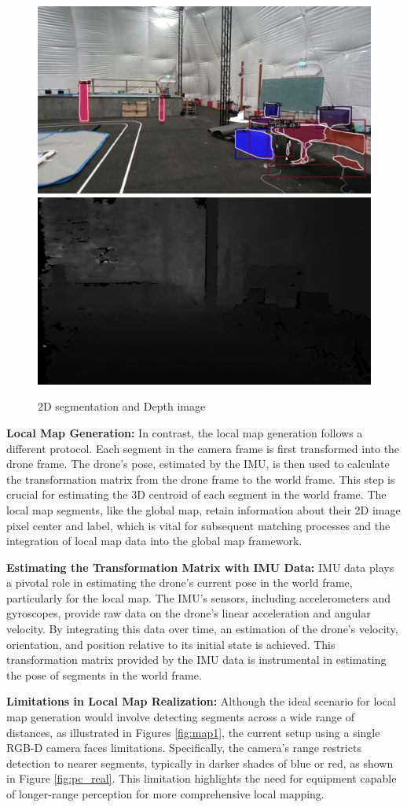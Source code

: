 \begin{figure}[H]
    \centering
    \includegraphics[width=.5\linewidth]{Pictures/mapping/vis_rgb.png}\hfill
    \includegraphics[width=.5\linewidth]{Pictures/mapping/vis_depth.png}
    \caption{2D segmentation and Depth image}
    \label{fig:eg1}
\end{figure}
\textbf{Local Map Generation:}
In contrast, the local map generation follows a different protocol. Each segment in the camera frame is first transformed into the drone frame. The drone's pose, estimated by the IMU, is then used to calculate the transformation matrix from the drone frame to the world frame. This step is crucial for estimating the 3D centroid of each segment in the world frame. The local map segments, like the global map, retain information about their 2D image pixel center and label, which is vital for subsequent matching processes and the integration of local map data into the global map framework.

\textbf{Estimating the Transformation Matrix with IMU Data:}
IMU data plays a pivotal role in estimating the drone's current pose in the world frame, particularly for the local map. The IMU's sensors, including accelerometers and gyroscopes, provide raw data on the drone's linear acceleration and angular velocity. By integrating this data over time, an estimation of the drone's velocity, orientation, and position relative to its initial state is achieved. This transformation matrix provided by the IMU data is instrumental in estimating the pose of segments in the world frame.

\textbf{Limitations in Local Map Realization:}
Although the ideal scenario for local map generation would involve detecting segments across a wide range of distances, as illustrated in Figures \ref{fig:map1}, the current setup using a single RGB-D camera faces limitations. Specifically, the camera's range restricts detection to nearer segments, typically in darker shades of blue or red, as shown in Figure \ref{fig:pc_real}. This limitation highlights the need for equipment capable of longer-range perception for more comprehensive local mapping.

